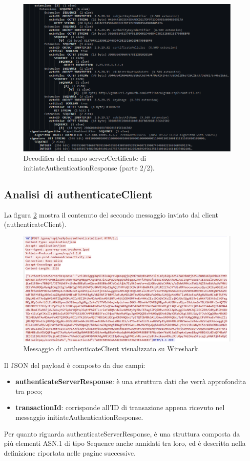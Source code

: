 \documentclass[10pt, oneside]{book}
\begin{document}
\begin{figure}
\includegraphics[width=\linewidth]{decode-serverCertificate2.png}
\caption{Decodifica del campo serverCertificate di initiateAuthenticationResponse (parte 2/2).}
\label{fig:decode-serverCertificate2}
\end{figure}

\subsection{Analisi di authenticateClient}
La figura \ref{fig:msg3-stream-pcap} mostra il contenuto del secondo messaggio inviato dal client (authenticateClient).\\
\begin{figure}
\includegraphics[width=\linewidth]{msg3-stream-pcap.png}
\caption{Messaggio di authenticateClient visualizzato su Wireshark.}
\label{fig:msg3-stream-pcap}
\end{figure}
Il JSON del payload è composto da due campi:
\begin{itemize}
\item \textbf{authenticateServerResponse}: è una struttura dati che verrà approfondita tra poco;
\item \textbf{transactionId}: corrisponde all'ID di transazione appena ricevuto nel messaggio initiateAuthenticationResponse.
\end{itemize}
Per quanto riguarda authenticateServerResponse, è una struttura composta da più elementi ASN.1 di tipo Sequence anche annidati tra loro, ed è descritta nella definizione riportata nelle pagine successive\cite{RSP-definitions}.\\
\end{document}
